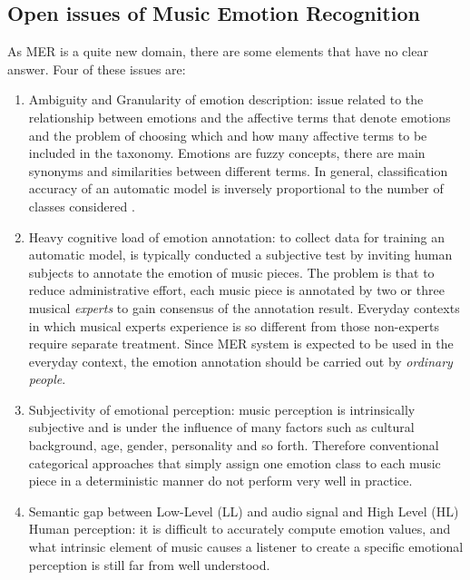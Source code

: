 \subsection{Open issues of Music Emotion Recognition} \label{issues}
As MER is a quite new domain, there are some elements that have no clear answer. Four of these issues are:
\begin{enumerate}
	\item Ambiguity and Granularity of emotion description: issue related to the relationship between emotions and the affective terms that denote emotions and the problem of choosing which and how many affective terms to be included in the taxonomy. Emotions are fuzzy concepts, there are main synonyms and similarities between different terms. In general, classification accuracy of an automatic model is inversely proportional to the number of classes considered \cite{van2006emotion}.
	\item Heavy cognitive load of emotion annotation: to collect data for training an automatic model, is typically conducted a subjective test by inviting human subjects to annotate the emotion of music pieces. The problem is that to reduce administrative effort, each music piece is annotated by two or three musical \textit{experts} to gain consensus of the annotation result. Everyday contexts in which musical experts experience is so different from those non-experts require separate treatment. Since MER system is expected to be used in the everyday context, the emotion annotation should be carried out by \textit{ordinary people}.
	\item Subjectivity of emotional perception: music perception is intrinsically subjective and is under the influence of many factors such as cultural background, age, gender, personality and so forth. Therefore conventional categorical approaches that simply assign one emotion class to each music piece in a deterministic manner do not perform very well in practice.
	\item Semantic gap between Low-Level (LL) and audio signal and High Level (HL) Human perception: it is difficult to accurately compute emotion values, and what intrinsic element of music causes a listener to create a specific emotional perception is still far from well understood.
\end{enumerate}

